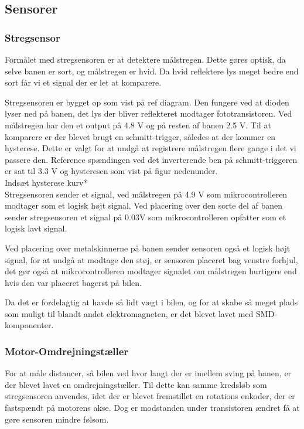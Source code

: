 
\subsection{Sensorer}


\subsubsection{Stregsensor}
Formålet med stregsensoren er at detektere målstregen. Dette gøres optisk, da selve banen er sort, og målstregen er hvid. Da hvid reflektere lys meget bedre end sort får vi et signal der er let at komparere.

Stregsensoren er bygget op som vist på ref diagram. Den fungere ved at dioden lyser ned på banen, det lys der bliver reflekteret modtager fototransistoren. Ved målstregen har den et output på 4.8 V og på resten af banen 2.5 V. Til at komparere er der blevet brugt en schmitt-trigger, således at der kommer en hysterese. Dette er valgt for at undgå at registrere målstregen flere gange i det vi passere den. Reference spændingen ved det inverterende ben på schmitt-triggeren er sat til 3.3 V og hysteresen som vist på figur nedenunder.
\\
Indsæt hysterese kurv*
\\
Stregsensoren sender et signal, ved målstregen på 4.9 V som  mikrocontrolleren modtager som et logisk højt signal. Ved placering over den sorte del af banen sender stregsensoren et signal på 0.03V som mikrocontrolleren opfatter som et logisk lavt signal. 

Ved placering over metalskinnerne på banen sender sensoren også et logisk højt signal, for at undgå at modtage den støj, er sensoren placeret bag venstre forhjul, det gør også at mikrocontrolleren modtager signalet om målstregen hurtigere end hvis den var placeret bagerst på bilen. 

Da det er fordelagtig at havde så lidt vægt i bilen, og for at skabe så meget plads som muligt til blandt andet elektromagneten, er det blevet lavet med SMD-komponenter. 


\subsubsection{Motor-Omdrejningstæller}

For at måle distancer, så bilen ved hvor langt der er imellem sving på banen, er der blevet lavet en omdrejningstæller. Til dette kan samme kredsløb som stregsensoren anvendes, idet der er blevet fremstillet en rotations enkoder, der er fastspændt på motorens akse. Dog er modstanden under transistoren ændret få at gøre sensoren mindre følsom.   


